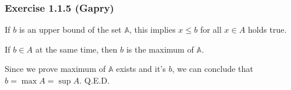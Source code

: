 \subsubsection*{Exercise 1.1.5 (Gapry)}

\begin{flushleft}
If $b$ is an upper bound of the set $\mathbb{A}$, this implies $x \le b$ for all $x \in A$ holds true. 

If $b \in A$ at the same time, then $b$ is the maximum of $\mathbb{A}$.

Since we prove maximum of $\mathbb{A}$ exists and it's $b$, 
we can conclude that $b = \max A = \sup A$. Q.E.D.
\end{flushleft}